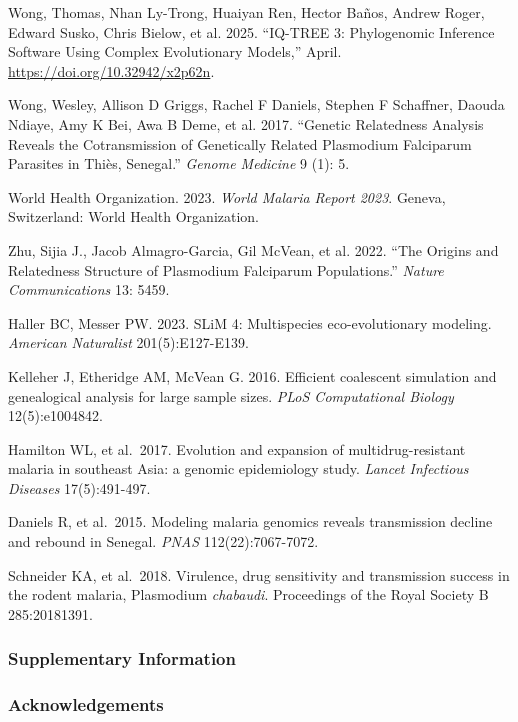 \documentclass[
  11pt,
]{article}
\newlength{\cslhangindent}
\newenvironment{CSLReferences}[2] %
 {\begin{list}{}{%
  \setlength{\itemindent}{0pt}
  \setlength{\leftmargin}{0pt}
  \setlength{\parsep}{0pt}
  \ifodd #1
   \setlength{\leftmargin}{\cslhangindent}
   \setlength{\itemindent}{-1\cslhangindent}
  \fi
  \setlength{\itemsep}{#2\baselineskip}}}
 {\end{list}}
\begin{document}
\begin{CSLReferences}{1}{0}
Wong, Thomas, Nhan Ly-Trong, Huaiyan Ren, Hector Baños, Andrew Roger,
Edward Susko, Chris Bielow, et al. 2025. {``IQ-TREE 3: Phylogenomic
Inference Software Using Complex Evolutionary Models,''} April.
\url{https://doi.org/10.32942/x2p62n}.

Wong, Wesley, Allison D Griggs, Rachel F Daniels, Stephen F Schaffner,
Daouda Ndiaye, Amy K Bei, Awa B Deme, et al. 2017. {``Genetic
Relatedness Analysis Reveals the Cotransmission of Genetically Related
Plasmodium Falciparum Parasites in Thi{è}s, Senegal.''} \emph{Genome
Medicine} 9 (1): 5.

World Health Organization. 2023. \emph{World Malaria Report 2023}.
Geneva, Switzerland: World Health Organization.

Zhu, Sijia J., Jacob Almagro-Garcia, Gil McVean, et al. 2022. {``The
Origins and Relatedness Structure of Plasmodium Falciparum
Populations.''} \emph{Nature Communications} 13: 5459.

\end{CSLReferences}

Haller BC, Messer PW. 2023. SLiM 4: Multispecies eco-evolutionary
modeling. \emph{American Naturalist} 201(5):E127-E139.

Kelleher J, Etheridge AM, McVean G. 2016. Efficient coalescent
simulation and genealogical analysis for large sample sizes. \emph{PLoS
Computational Biology} 12(5):e1004842.

Hamilton WL, et al.~2017. Evolution and expansion of multidrug-resistant
malaria in southeast Asia: a genomic epidemiology study. \emph{Lancet
Infectious Diseases} 17(5):491-497.

Daniels R, et al.~2015. Modeling malaria genomics reveals transmission
decline and rebound in Senegal. \emph{PNAS} 112(22):7067-7072.

Schneider KA, et al.~2018. Virulence, drug sensitivity and transmission
success in the rodent malaria, Plasmodium \emph{chabaudi}. Proceedings
of the Royal Society B 285:20181391.

\newpage

\subsubsection{Supplementary
Information}\label{supplementary-information}

\subsubsection{Acknowledgements}\label{acknowledgements}
\end{document}
